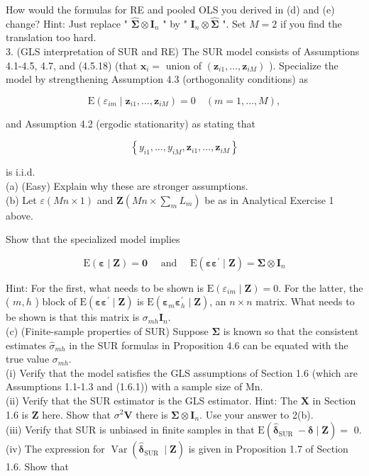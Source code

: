 \documentclass[10pt]{article}
\begin{document}
How would the formulas for RE and pooled OLS you derived in (d) and (e) change? Hint: Just replace " $\widehat{\boldsymbol{\Sigma}} \otimes \mathbf{I}_{n}$ " by " $\mathbf{I}_{n} \otimes \widehat{\boldsymbol{\Sigma}}$ ". Set $M=2$ if you find the translation too hard.\\
3. (GLS interpretation of SUR and RE) The SUR model consists of Assumptions 4.1-4.5, 4.7, and (4.5.18) (that $\mathbf{x}_{i}=$ union of $\left(\mathbf{z}_{i 1}, \ldots, \mathbf{z}_{i M}\right)$ ). Specialize the model by strengthening Assumption 4.3 (orthogonality conditions) as

$$
\mathrm{E}\left(\varepsilon_{i m} \mid \mathbf{z}_{i 1}, \ldots, \mathbf{z}_{i M}\right)=0 \quad(m=1, \ldots, M),
$$

and Assumption 4.2 (ergodic stationarity) as stating that

$$
\left\{y_{i 1}, \ldots, y_{i M}, \mathbf{z}_{i 1}, \ldots, \mathbf{z}_{i M}\right\}
$$

is i.i.d.\\
(a) (Easy) Explain why these are stronger assumptions.\\
(b) Let $\varepsilon(M n \times 1)$ and $\mathbf{Z}\left(M n \times \sum_{m} L_{m}\right)$ be as in Analytical Exercise 1 above.

Show that the specialized model implies

$$
\mathrm{E}(\boldsymbol{\varepsilon} \mid \mathbf{Z})=\mathbf{0} \quad \text { and } \quad \mathrm{E}\left(\boldsymbol{\varepsilon} \boldsymbol{\varepsilon}^{\prime} \mid \mathbf{Z}\right)=\mathbf{\Sigma} \otimes \mathbf{I}_{n}
$$

Hint: For the first, what needs to be shown is $\mathrm{E}\left(\varepsilon_{i m} \mid \mathbf{Z}\right)=0$. For the latter, the ( $m, h$ ) block of $\mathrm{E}\left(\boldsymbol{\varepsilon} \boldsymbol{\varepsilon}^{\prime} \mid \mathbf{Z}\right)$ is $\mathrm{E}\left(\boldsymbol{\varepsilon}_{m} \boldsymbol{\varepsilon}_{h}^{\prime} \mid \mathbf{Z}\right)$, an $n \times n$ matrix. What needs to be shown is that this matrix is $\sigma_{m h} \mathbf{I}_{n}$.\\
(c) (Finite-sample properties of SUR) Suppose $\boldsymbol{\Sigma}$ is known so that the consistent estimates $\hat{\sigma}_{m h}$ in the SUR formulas in Proposition 4.6 can be equated with the true value $\sigma_{m h}$.\\
(i) Verify that the model satisfies the GLS assumptions of Section 1.6 (which are Assumptions 1.1-1.3 and (1.6.1)) with a sample size of Mn.\\
(ii) Verify that the SUR estimator is the GLS estimator. Hint: The $\mathbf{X}$ in Section 1.6 is $\mathbf{Z}$ here. Show that $\sigma^{2} \mathbf{V}$ there is $\mathbf{\Sigma} \otimes \mathbf{I}_{n}$. Use your answer to 2(b).\\
(iii) Verify that SUR is unbiased in finite samples in that $\mathrm{E}\left(\hat{\boldsymbol{\delta}}_{\text {SUR }}-\boldsymbol{\delta} \mid \mathbf{Z}\right)=$ 0.\\
(iv) The expression for $\operatorname{Var}\left(\hat{\boldsymbol{\delta}}_{\text {SUR }} \mid \mathbf{Z}\right)$ is given in Proposition 1.7 of Section 1.6. Show that
\end{document}
